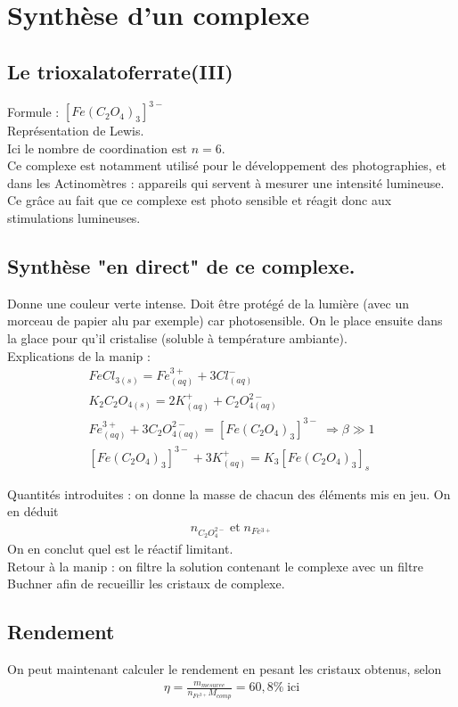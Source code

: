 \documentclass[12pt,prb,aps,epsf]{article}
\begin{document}
\section{Synthèse d'un complexe}
\subsection{Le trioxalatoferrate(III)}

Formule : $[Fe(C_2O_4)_3]^{3-}$\\
Représentation de Lewis.\\
Ici le nombre de coordination est $n=6$.\\
Ce complexe est notamment utilisé pour le développement des photographies, et dans les Actinomètres : appareils qui servent à mesurer une intensité lumineuse. Ce grâce au fait que ce complexe est photo sensible et réagit donc aux stimulations lumineuses.
\subsection{Synthèse "en direct" de ce complexe.} Donne une couleur verte intense. Doit être protégé de la lumière (avec un morceau de papier alu par exemple) car photosensible. On le place ensuite dans la glace pour qu'il cristalise (soluble à température ambiante).\\
Explications de la manip :
\begin{eqnarray}
FeCl_{3(s)} = Fe^{3+}_{(aq)} + 3Cl^-_{(aq)}\\
K_2C_2O_{4(s)} = 2K^+_{(aq)} + C_2O^{2-}_{4(aq)}\\
Fe^{3+}_{(aq)} + 3C_2O^{2-}_{4(aq)} = [Fe(C_2O_4)_3]^{3-}\;\Rightarrow\beta\gg 1\\
\left[Fe(C_2O_4)_3\right]^{3-} + 3K^+_{(aq)} = K_3[Fe(C_2O_4)_3]_{s}
\end{eqnarray}

Quantités introduites : on donne la masse de chacun des éléments mis en jeu. On en déduit 
\begin{eqnarray}
n_{C_2O_4^{2-}} \; \mathrm{et} \; n_{Fe^{3+}}
\end{eqnarray}
On en conclut quel est le réactif limitant.\\

Retour à la manip : on filtre la solution contenant le complexe avec un filtre Buchner afin de recueillir les cristaux de complexe.\\
\subsection{Rendement}
On peut maintenant calculer le rendement en pesant les cristaux obtenus, selon
\begin{eqnarray}
\eta = \frac{m_{mesuree}}{n_{Fe^{3+}}M_{comp}} = 60,8\% \; \mathrm{ici}
\end{eqnarray}
\end{document}
